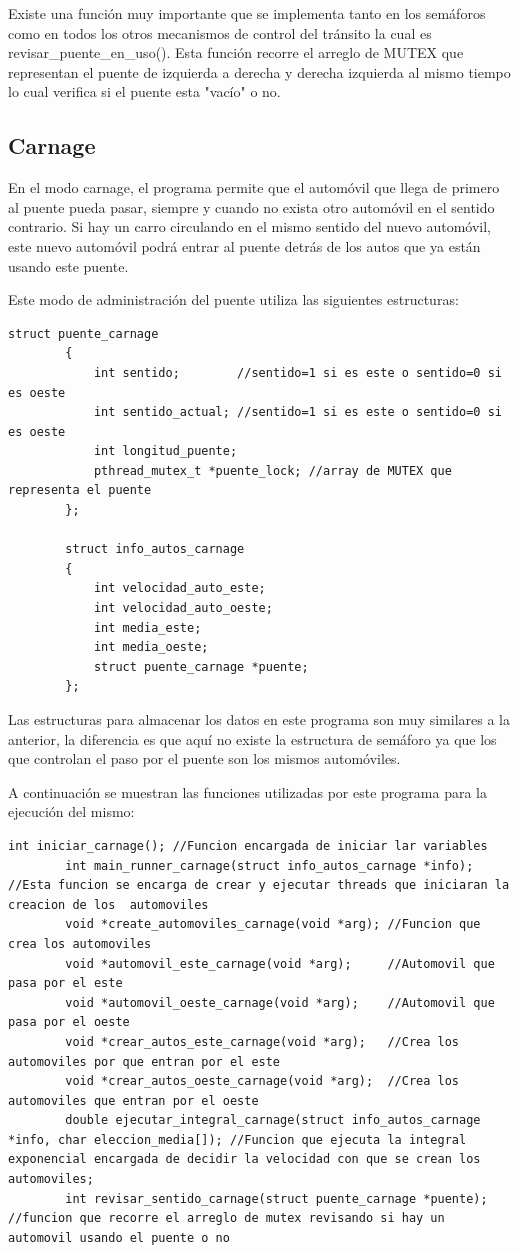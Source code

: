 \documentclass[16pt,a4papper]{article}
\begin{document}
	Existe una función muy importante que se implementa tanto en los semáforos como en todos los otros mecanismos de control del tránsito la cual es revisar\_puente\_en\_uso(). Esta función recorre el arreglo de MUTEX que representan el puente de izquierda a derecha y derecha izquierda al mismo tiempo lo cual verifica si el puente esta "vacío" o no.
	
	\subsection{Carnage}
	En el modo carnage, el programa permite que el automóvil que llega de primero al puente pueda pasar, siempre y cuando no exista otro automóvil en el sentido contrario. Si hay un carro circulando en el mismo sentido del nuevo automóvil, este nuevo automóvil podrá entrar al puente detrás de los autos que ya están usando este puente.
	
	Este modo de administración del puente utiliza las siguientes estructuras:
	
	\begin{lstlisting}[style=CStyle]
		struct puente_carnage
		{
			int sentido;        //sentido=1 si es este o sentido=0 si es oeste
			int sentido_actual; //sentido=1 si es este o sentido=0 si es oeste
			int longitud_puente;
			pthread_mutex_t *puente_lock; //array de MUTEX que representa el puente
		};
		
		struct info_autos_carnage
		{
			int velocidad_auto_este;
			int velocidad_auto_oeste;
			int media_este;
			int media_oeste;
			struct puente_carnage *puente;
		};
	\end{lstlisting}

	Las estructuras para almacenar los datos en este programa son muy similares a la anterior, la diferencia es que aquí no existe la estructura de semáforo ya que los que controlan el paso por el puente son los mismos automóviles.\par
	A continuación se muestran las funciones utilizadas por este programa para la ejecución del mismo:
	\begin{lstlisting}[style=CStyle]
		int iniciar_carnage(); //Funcion encargada de iniciar lar variables
		int main_runner_carnage(struct info_autos_carnage *info); //Esta funcion se encarga de crear y ejecutar threads que iniciaran la creacion de los  automoviles
		void *create_automoviles_carnage(void *arg); //Funcion que crea los automoviles
		void *automovil_este_carnage(void *arg);     //Automovil que pasa por el este
		void *automovil_oeste_carnage(void *arg);    //Automovil que pasa por el oeste
		void *crear_autos_este_carnage(void *arg);   //Crea los automoviles por que entran por el este
		void *crear_autos_oeste_carnage(void *arg);  //Crea los automoviles que entran por el oeste
		double ejecutar_integral_carnage(struct info_autos_carnage *info, char eleccion_media[]); //Funcion que ejecuta la integral exponencial encargada de decidir la velocidad con que se crean los automoviles;
		int revisar_sentido_carnage(struct puente_carnage *puente); //funcion que recorre el arreglo de mutex revisando si hay un automovil usando el puente o no
	\end{lstlisting}
\end{document}
